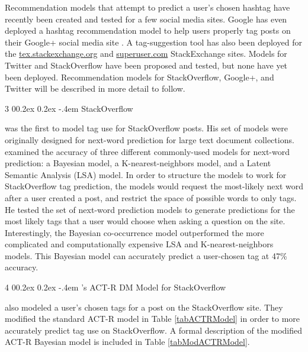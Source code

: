 \documentclass[man,floatsintext,donotrepeattitle]{apa6}
\makeatletter
\renewcommand{\subsubsection}{%
  \@startsection
  {subsubsection}%
  {3}%
  {\parindent}%
  {0\baselineskip \@plus 0.2ex \@minus 0.2ex}%
  {-.4em}%
  {\normalfont\normalsize\bfseries\addperi}}
\renewcommand{\paragraph}{%
  \@startsection
  {paragraph}%
  {4}%
  {\parindent}%
  {0\baselineskip \@plus 0.2ex \@minus 0.2ex}%
  {-.4em}%
  {\normalfont\normalsize\bfseries\itshape\addperi}}
\makeatother
\begin{document}
Recommendation models that attempt to predict a user's chosen hashtag have recently been created and tested for a few social media sites.
Google has even deployed a hashtag recommendation model to help users properly tag posts on their Google+ social media site \parencite{GoogleKeynote2013}.
A tag-suggestion tool has also been deployed for the \url{tex.stackexchange.org} and \url{superuser.com} StackExchange sites.
Models for Twitter and StackOverflow have been proposed and tested, but none have yet been deployed.
Recommendation models for StackOverflow, Google+, and Twitter will be described in more detail to follow.

\subsubsection{StackOverflow}

\textcite{Kuo2011} was the first to model tag use for StackOverflow posts.
His set of models were originally designed for next-word prediction for large text document collections.
\citeauthor{Kuo2011} examined the accuracy of three different commonly-used models for next-word prediction: a Bayesian model, a K-nearest-neighbors model, and a Latent Semantic Analysis (LSA) model.
In order to structure the models to work for StackOverflow tag prediction, the models would request the most-likely next word after a user created a post, and restrict the space of possible words to only tags.
He tested the set of next-word prediction models to generate predictions for the most likely tags that a user would choose when asking a question on the site.
Interestingly, the Bayesian co-occurrence model outperformed the more complicated and computationally expensive LSA and K-nearest-neighbors models.
This Bayesian model can accurately predict a user-chosen tag at 47\% accuracy.

\paragraph{\texorpdfstring{\textcite{Stanley2013}}{Stanley2013}'s ACT-R DM Model for StackOverflow}

\textcite{Stanley2013} also modeled a user's chosen tags for a post on the StackOverflow site.
They modified the standard ACT-R model in Table \ref{tabACTRModel} in order to more accurately predict tag use on StackOverflow.
A formal description of the modified ACT-R Bayesian model is included in Table \ref{tabModACTRModel}.
\end{document}

